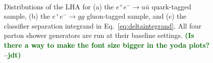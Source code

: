 \documentclass[11pt]{cernrep}
\newcommand{\jdt}[1]{\textbf{\textcolor{darkgreen}{(#1 --jdt)}}}
\begin{document}
\begin{figure}
\centering
{}
$\quad$
$\quad$
\caption{Distributions of the LHA for (a) the $e^+ e^- \to u \bar{u}$ quark-tagged sample, (b) the $e^+ e^- \to gg$ gluon-tagged sample, and (c) the classifier separation integrand in Eq.~\eqref{eq:deltaintegrand}.  All four parton shower generators are run at their baseline settings.  \jdt{Is there a way to make the font size bigger in the yoda plots?}}
\label{fig:LHA_hadron}
\end{figure}
\end{document}
